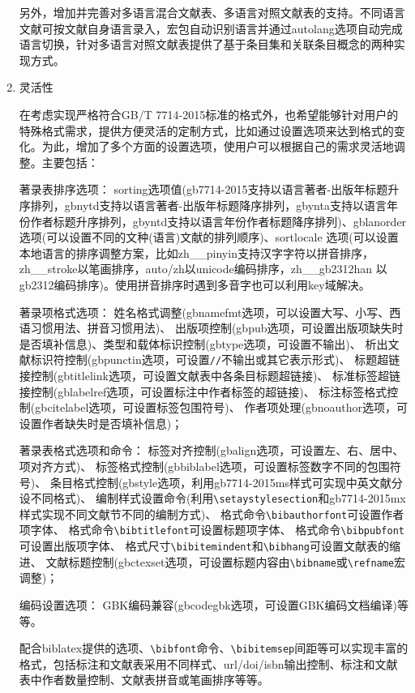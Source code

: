 \documentclass[11pt]{article} %
\begin{document}
\begin{enumerate}
另外，增加并完善对多语言混合文献表、多语言对照文献表的支持。不同语言文献可按文献自身语言录入，宏包自动识别语言并通过autolang选项自动完成语言切换，针对多语言对照文献表提供了基于条目集和关联条目概念的两种实现方式。


  \item 灵活性

在考虑实现严格符合GB/T 7714-2015标准的格式外，也希望能够针对用户的特殊格式需求，提供方便灵活的定制方式，比如通过设置选项来达到格式的变化。为此，增加了多个方面的设置选项，使用户可以根据自己的需求灵活地调整。主要包括：

著录表排序选项：
sorting选项值(gb7714-2015支持以语言著者-出版年标题升序排列，gbnytd支持以语言著者-出版年标题降序排列，gbynta支持以语言年份作者标题升序排列，gbyntd支持以语言年份作者标题降序排列)、gblanorder 选项(可以设置不同的文种(语言)文献的排列顺序)、sortlocale 选项(可以设置本地语言的排序调整方案，比如zh\_\_pinyin支持汉字字符以拼音排序，zh\_\_stroke以笔画排序，auto/zh以unicode编码排序，zh\_\_gb2312han 以gb2312编码排序)。使用拼音排序时遇到多音字也可以利用key域解决。



著录项格式选项：
姓名格式调整(gbnamefmt选项，可以设置大写、小写、西语习惯用法、拼音习惯用法)、
出版项控制(gbpub选项，可设置出版项缺失时是否填补信息)、类型和载体标识控制(gbtype选项，可设置不输出)、
析出文献标识符控制(gbpunctin选项，可设置\texttt{//}不输出或其它表示形式)、
标题超链接控制(gbtitlelink选项，可设置文献表中各条目标题超链接)、
标准标签超链接控制(gblabelref选项，可设置标注中作者标签的超链接)、
标注标签格式控制(gbcitelabel选项，可设置标签包围符号)、
作者项处理(gbnoauthor选项，可设置作者缺失时是否填补信息)；

著录表格式选项和命令：
标签对齐控制(gbalign选项，可设置左、右、居中、项对齐方式)、
标签格式控制(gbbiblabel选项，可设置标签数字不同的包围符号)、
条目格式控制(gbstyle选项，利用gb7714-2015ms样式可实现中英文献分设不同格式)、
编制样式设置命令(利用\verb|\setaystylesection|和gb7714-2015mx样式实现不同文献节不同的编制方式)、
格式命令\verb|\bibauthorfont|可设置作者项字体、
格式命令\verb|\bibtitlefont|可设置标题项字体、
格式命令\verb|\bibpubfont|可设置出版项字体、
格式尺寸\verb|\bibitemindent|和\verb|\bibhang|可设置文献表的缩进、
文献标题控制(gbctexset选项，可设置标题内容由\verb|\bibname|或\verb|\refname|宏调整)；

编码设置选项：
GBK编码兼容(gbcodegbk选项，可设置GBK编码文档编译)等等。

配合biblatex提供的选项、\verb|\bibfont|命令、\verb|\bibitemsep|间距等可以实现丰富的格式，包括标注和文献表采用不同样式、url/doi/isbn输出控制、标注和文献表中作者数量控制、文献表拼音或笔画排序等等。



\end{enumerate}
\end{document}
